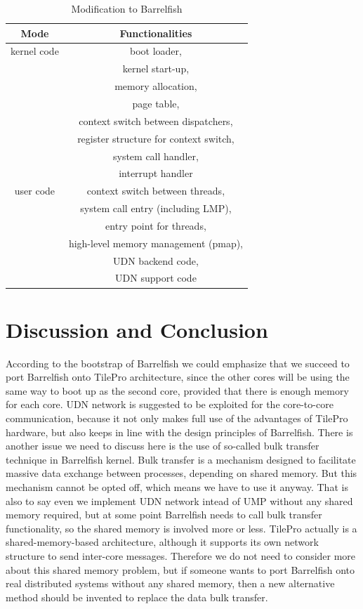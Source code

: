 \documentclass[a4paper,twoside]{report} %
\begin{document}
\begin{table}[h]
\caption{Modification to Barrelfish}
\centering
\begin{tabular}{c | c} %
\hline \hline
Mode & Functionalities \\ [0.5ex]
\hline \hline
kernel code & boot loader, \\ 
& kernel start-up, \\
& memory allocation, \\
& page table, \\
& context switch between dispatchers, \\
& register structure for context switch, \\
& system call handler, \\
& interrupt handler \\ [0.5ex]
\hline
user code & context switch between threads, \\
& system call entry (including LMP), \\
& entry point for threads, \\
& high-level memory management (pmap), \\
& UDN backend code, \\
& UDN support code \\ [0.5ex]
\hline
\end{tabular}
\label{table:modification}
\end{table}


\chapter{Discussion and Conclusion}
According to the bootstrap of Barrelfish we could emphasize that we succeed to port Barrelfish onto TilePro architecture, since the other cores will be using the same way to boot up as the second core, provided that there is enough memory for each core. UDN network is suggested to be exploited for the core-to-core communication, because it not only makes full use of the advantages of TilePro hardware, but also keeps in line with the design principles of Barrelfish. There is another issue we need to discuss here is the use of so-called bulk transfer technique in Barrelfish kernel. Bulk transfer is a mechanism designed to facilitate massive data exchange between processes, depending on shared memory. But this mechanism cannot be opted off, which means we have to use it anyway. That is also to say even we implement UDN network intead of UMP without any shared memory required, but at some point Barrelfish needs to call bulk transfer functionality, so the shared memory is involved more or less. TilePro actually is a shared-memory-based architecture, although it supports its own network structure to send inter-core messages. Therefore we do not need to consider more about this shared memory problem, but if someone wants to port Barrelfish onto real distributed systems without any shared memory, then a new alternative method should be invented to replace the data bulk transfer.
\end{document}
